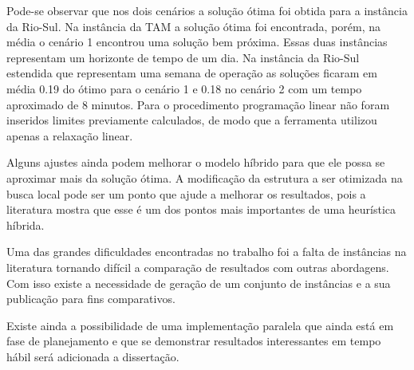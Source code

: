 Pode-se observar que nos dois cenários a solução ótima foi obtida para a
instância da Rio-Sul. Na instância da TAM a solução ótima foi encontrada,
porém, na média o cenário 1 encontrou uma solução bem próxima. Essas duas
instâncias representam um horizonte de tempo de um dia. Na instância da Rio-Sul
estendida que representam uma semana de operação as soluções ficaram em média
0.19 do ótimo para o cenário 1 e 0.18 no cenário 2 com um tempo aproximado de 8
minutos. Para o procedimento programação linear não foram inseridos limites
previamente calculados, de modo que a ferramenta utilizou apenas a relaxação
linear.
  
Alguns ajustes ainda podem melhorar o modelo híbrido para que ele possa se
aproximar mais da solução ótima. A modificação da estrutura a ser otimizada na
busca local pode ser um ponto que ajude a melhorar os resultados, pois a
literatura mostra que esse é um dos pontos mais importantes de uma heurística
híbrida.
 
Uma das grandes dificuldades encontradas no trabalho foi a falta de instâncias
na literatura tornando difícil a comparação de resultados com outras
abordagens. Com isso existe a necessidade de geração de um conjunto de
instâncias e a sua publicação para fins comparativos.
 
Existe ainda a possibilidade de uma implementação paralela que ainda está em
fase de planejamento e que se demonstrar resultados interessantes em tempo
hábil será adicionada a dissertação.
 







